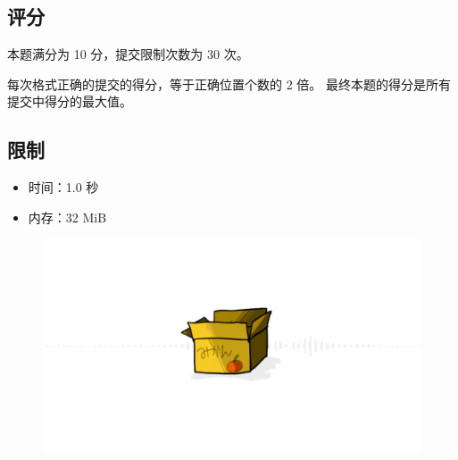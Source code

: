 \documentclass[UTF8, 11pt, a4paper]{article}
\begin{document}
\subsection*{评分}
本题满分为 10 分，提交限制次数为 30 次。

每次格式正确的提交的得分，等于正确位置个数的 2 倍。%
最终本题的得分是所有提交中得分的最大值。

\subsection*{限制}
\begin{itemize}
\item 时间：1.0 秒
\item 内存：32 MiB
\end{itemize}

\begin{figure}[h]\centering
\includegraphics[width=0.6 \textwidth]{hako.png}
\end{figure}
\end{document}

